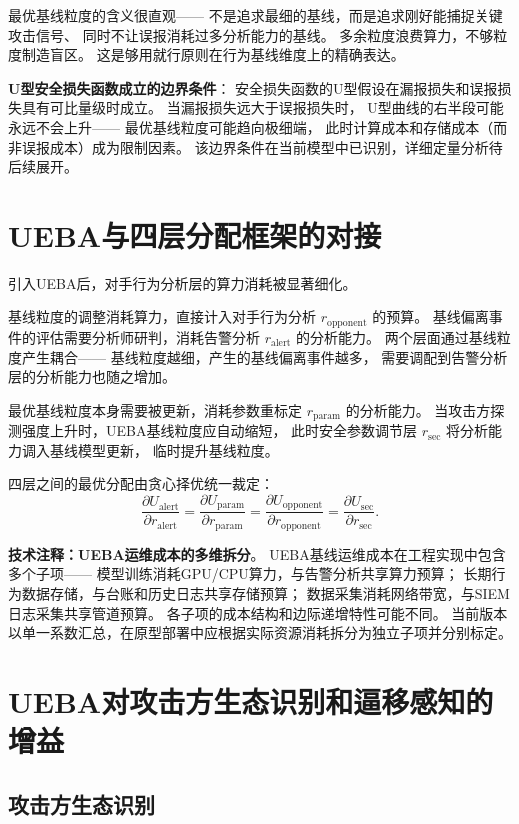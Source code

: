 \documentclass[11pt,a4paper]{article}
\begin{document}
最优基线粒度的含义很直观——
不是追求最细的基线，而是追求刚好能捕捉关键攻击信号、
同时不让误报消耗过多分析能力的基线。
多余粒度浪费算力，不够粒度制造盲区。
这是够用就行原则在行为基线维度上的精确表达。

\textbf{U型安全损失函数成立的边界条件}：
安全损失函数的U型假设在漏报损失和误报损失具有可比量级时成立。
当漏报损失远大于误报损失时，
U型曲线的右半段可能永远不会上升——
最优基线粒度可能趋向极细端，
此时计算成本和存储成本（而非误报成本）成为限制因素。
该边界条件在当前模型中已识别，详细定量分析待后续展开。

\section{UEBA与四层分配框架的对接}

引入UEBA后，对手行为分析层的算力消耗被显著细化。

基线粒度的调整消耗算力，直接计入对手行为分析 \(r_{\text{opponent}}\) 的预算。
基线偏离事件的评估需要分析师研判，消耗告警分析 \(r_{\text{alert}}\) 的分析能力。
两个层面通过基线粒度产生耦合——
基线粒度越细，产生的基线偏离事件越多，
需要调配到告警分析层的分析能力也随之增加。

最优基线粒度本身需要被更新，消耗参数重标定 \(r_{\text{param}}\) 的分析能力。
当攻击方探测强度上升时，UEBA基线粒度应自动缩短，
此时安全参数调节层 \(r_{\text{sec}}\) 将分析能力调入基线模型更新，
临时提升基线粒度。

四层之间的最优分配由贪心择优统一裁定：
\[
\frac{\partial U_{\text{alert}}}{\partial r_{\text{alert}}} =
\frac{\partial U_{\text{param}}}{\partial r_{\text{param}}} =
\frac{\partial U_{\text{opponent}}}{\partial r_{\text{opponent}}} =
\frac{\partial U_{\text{sec}}}{\partial r_{\text{sec}}}.
\]

\textbf{技术注释：UEBA运维成本的多维拆分}。
UEBA基线运维成本在工程实现中包含多个子项——
模型训练消耗GPU/CPU算力，与告警分析共享算力预算；
长期行为数据存储，与台账和历史日志共享存储预算；
数据采集消耗网络带宽，与SIEM日志采集共享管道预算。
各子项的成本结构和边际递增特性可能不同。
当前版本以单一系数汇总，在原型部署中应根据实际资源消耗拆分为独立子项并分别标定。

\section{UEBA对攻击方生态识别和逼移感知的增益}

\subsection{攻击方生态识别}
\end{document}
